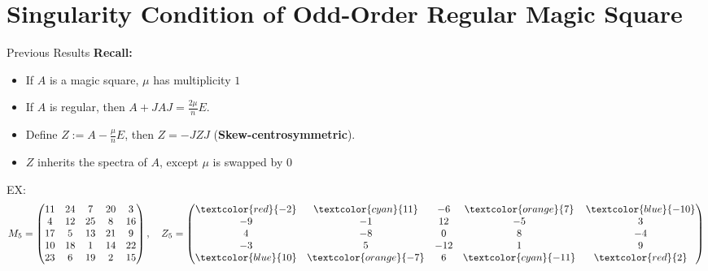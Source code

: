 \documentclass[10pt]{beamer}
\begin{document}
\section{Singularity Condition of Odd-Order Regular Magic Square}
\begin{frame}{Previous Results}
    \textbf{Recall:}
    \begin{itemize}
        \item If $A$ is a magic square, $\mu$ has multiplicity $1$
        \item If $A$ is regular, then $A+JAJ = \frac{2\mu}{n}E$.
        \item Define $Z:=A-\frac{\mu}{n}E$, then $Z=-JZJ$ (\textbf{Skew-centrosymmetric}).
        \item $Z$ inherits the spectra of $A$, except $\mu$ is swapped by $0$
    \end{itemize}
    EX:
    \[M_5 = \begin{pmatrix}
        11&24&7&20&3\\
        4&12&25&8&16\\
        17&5&13&21&9\\
        10&18&1&14&22\\
        23&6&19&2&15
    \end{pmatrix},\quad Z_5=\begin{pmatrix}
        \textcolor{red}{-2}&\textcolor{cyan}{11}&-6&\textcolor{orange}{7}&\textcolor{blue}{-10}\\
        -9&-1&12&-5&3\\
        4&-8&0&8&-4\\
        -3&5&-12&1&9\\
        \textcolor{blue}{10}&\textcolor{orange}{-7}&6&\textcolor{cyan}{-11}&\textcolor{red}{2}
    \end{pmatrix}\]
\end{frame}
\end{document}
